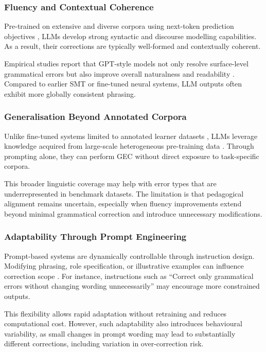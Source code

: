 \subsubsection{Fluency and Contextual Coherence}

Pre-trained on extensive and diverse corpora using next-token prediction objectives \cite{NEURIPS2020_1457c0d6}, LLMs develop strong syntactic and discourse modelling capabilities. As a result, their corrections are typically well-formed and contextually coherent.

Empirical studies report that GPT-style models not only resolve surface-level grammatical errors but also improve overall naturalness and readability \cite{loem2023exploringeffectivenessgpt3grammatical}. Compared to earlier SMT or fine-tuned neural systems, LLM outputs often exhibit more globally consistent phrasing.

\subsubsection{Generalisation Beyond Annotated Corpora}

Unlike fine-tuned systems limited to annotated learner datasets \cite{ng-etal-2014-conll,bryant-etal-2019-bea}, LLMs leverage knowledge acquired from large-scale heterogeneous pre-training data \cite{NEURIPS2020_1457c0d6}. Through prompting alone, they can perform GEC without direct exposure to task-specific corpora.

This broader linguistic coverage may help with error types that are underrepresented in benchmark datasets. The limitation is that pedagogical alignment remains uncertain, especially when fluency improvements extend beyond minimal grammatical correction and introduce unnecessary modifications.

\subsubsection{Adaptability Through Prompt Engineering}

Prompt-based systems are dynamically controllable through instruction design. Modifying phrasing, role specification, or illustrative examples can influence correction scope \cite{liu2023pretrain}. For instance, instructions such as ``Correct only grammatical errors without changing wording unnecessarily'' may encourage more constrained outputs.

This flexibility allows rapid adaptation without retraining and reduces computational cost. However, such adaptability also introduces behavioural variability, as small changes in prompt wording may lead to substantially different corrections, including variation in over-correction risk.

